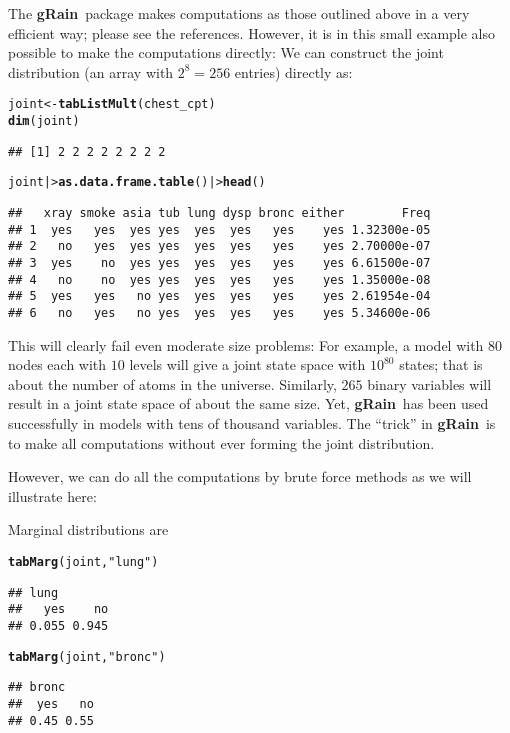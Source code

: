 \documentclass[10pt]{article}\usepackage[]{graphicx}\usepackage[]{xcolor}
\makeatletter
\newcommand{\hlstr}[1]{\textcolor[rgb]{0.192,0.494,0.8}{#1}}%
\newcommand{\hlstd}[1]{\textcolor[rgb]{0.345,0.345,0.345}{#1}}%
\newcommand{\hlkwb}[1]{\textcolor[rgb]{0.69,0.353,0.396}{#1}}%
\newcommand{\hlkwd}[1]{\textcolor[rgb]{0.737,0.353,0.396}{\textbf{#1}}}%
\newenvironment{kframe}{%
 \def\at@end@of@kframe{}%
 \ifinner\ifhmode%
  \def\at@end@of@kframe{\end{minipage}}%
  \begin{minipage}{\columnwidth}%
 \fi\fi%
 \def\FrameCommand##1{\hskip\@totalleftmargin \hskip-\fboxsep
 \colorbox{shadecolor}{##1}\hskip-\fboxsep
     \hskip-\linewidth \hskip-\@totalleftmargin \hskip\columnwidth}%
 \MakeFramed {\advance\hsize-\width
   \@totalleftmargin\z@ \linewidth\hsize
   \@setminipage}}%
 {\par\unskip\endMakeFramed%
 \at@end@of@kframe}
\newenvironment{knitrout}{}{} %
\def\grbn{{\bf gRain}}
\makeatother
\begin{document}
The \grbn\ package makes computations as those outlined above in a
very efficient way; please see the references.  However, it is in this
small example also possible to make the computations directly: We can
construct the joint distribution (an array with $2^8=256$ entries) directly as:
\begin{knitrout}
\color{fgcolor}\begin{kframe}
\begin{alltt}
\hlstd{joint} \hlkwb{<-} \hlkwd{tabListMult}\hlstd{(chest_cpt)}
\hlkwd{dim}\hlstd{(joint)}
\end{alltt}
\begin{verbatim}
## [1] 2 2 2 2 2 2 2 2
\end{verbatim}
\begin{alltt}
\hlstd{joint  |>} \hlkwd{as.data.frame.table}\hlstd{() |>} \hlkwd{head}\hlstd{()}
\end{alltt}
\begin{verbatim}
##   xray smoke asia tub lung dysp bronc either        Freq
## 1  yes   yes  yes yes  yes  yes   yes    yes 1.32300e-05
## 2   no   yes  yes yes  yes  yes   yes    yes 2.70000e-07
## 3  yes    no  yes yes  yes  yes   yes    yes 6.61500e-07
## 4   no    no  yes yes  yes  yes   yes    yes 1.35000e-08
## 5  yes   yes   no yes  yes  yes   yes    yes 2.61954e-04
## 6   no   yes   no yes  yes  yes   yes    yes 5.34600e-06
\end{verbatim}
\end{kframe}
\end{knitrout}

This will clearly fail even moderate size problems: For example, a
model with $80$
nodes each with $10$
levels will give a joint state space with $10^{80}$
states; that is about the number of atoms in the universe. Similarly,
$265$
binary variables will result in a joint state space of about the same
size. Yet, \grbn\ has been used successfully
in models with tens of
thousand variables.  The ``trick'' in \grbn\ is to make all
computations without ever forming the joint distribution. 

However, we
can do all the computations by brute force methods as we will
illustrate here:

Marginal distributions are
\begin{knitrout}
\color{fgcolor}\begin{kframe}
\begin{alltt}
\hlkwd{tabMarg}\hlstd{(joint,} \hlstr{"lung"}\hlstd{)}
\end{alltt}
\begin{verbatim}
## lung
##   yes    no 
## 0.055 0.945
\end{verbatim}
\begin{alltt}
\hlkwd{tabMarg}\hlstd{(joint,} \hlstr{"bronc"}\hlstd{)}
\end{alltt}
\begin{verbatim}
## bronc
##  yes   no 
## 0.45 0.55
\end{verbatim}
\end{kframe}
\end{knitrout}
\end{document}
